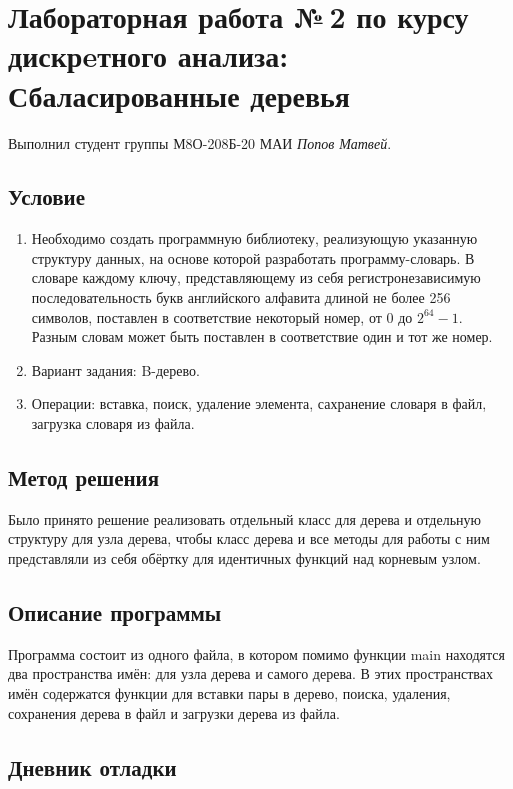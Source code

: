 \documentclass[12pt]{article}
\begin{document}
\section*{Лабораторная работа №\,2 по курсу дискрeтного анализа: Сбаласированные деревья}

Выполнил студент группы М8О-208Б-20 МАИ \textit{Попов Матвей}.

\subsection*{Условие}

\begin{enumerate}
\item Необходимо создать программную библиотеку, реализующую указанную структуру данных, 
на основе которой разработать программу-словарь. В словаре каждому ключу, представляющему 
из себя регистронезависимую последовательность букв английского алфавита длиной не более 
256 символов, поставлен в соответствие некоторый номер, от $0$ до $2^{64} - 1$. Разным словам 
может быть поставлен в соответствие один и тот же номер.
\item Вариант задания: B-дерево.
\item Операции: вставка, поиск, удаление элемента, сахранение словаря в файл, загрузка словаря 
из файла.
\end{enumerate}

\subsection*{Метод решения}

Было принято решение реализовать отдельный класс для дерева и отдельную структуру для узла 
дерева, чтобы класс дерева и все методы для работы с ним представляли из себя обёртку для 
идентичных функций над корневым узлом.

\subsection*{Описание программы}

Программа состоит из одного файла, в котором помимо функции main находятся два пространства 
имён: для узла дерева и самого дерева. В этих пространствах имён содержатся функции для 
вставки пары в дерево, поиска, удаления, сохранения дерева в файл и загрузки дерева из файла.

\subsection*{Дневник отладки}
\end{document}
